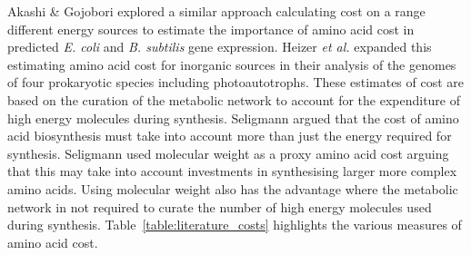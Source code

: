 Akashi \& Gojobori \cite{akashi2002} explored a similar approach calculating cost on a range different energy sources to estimate the importance of amino acid cost in predicted \emph{E. coli} and \emph{B. subtilis} gene expression. Heizer \emph{et al.} \cite{heizer2006} expanded this estimating amino acid cost for inorganic sources in their analysis of the genomes of four prokaryotic species including photoautotrophs. These estimates of cost are based on the curation of the metabolic network to account for the expenditure of high energy molecules during synthesis. Seligmann argued \cite{seligmann2003} that the cost of amino acid biosynthesis must take into account more than just the energy required for synthesis. Seligmann used molecular weight as a proxy amino acid cost arguing that this may take into account investments in synthesising larger more complex amino acids. Using molecular weight also has the advantage where the metabolic network in not required to curate the number of high energy molecules used during synthesis. Table~\ref{table:literature_costs} highlights the various measures of amino acid cost.




